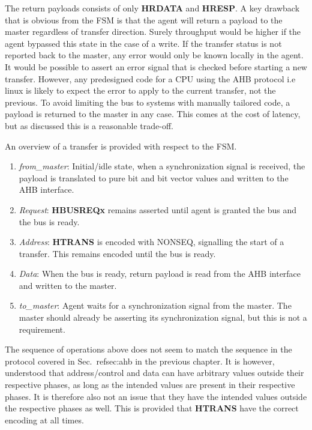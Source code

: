 The return payloads consists of only \textbf{HRDATA} and \textbf{HRESP}. A key drawback that is obvious from the FSM is that the agent will return a payload 
to the master regardless of transfer direction. Surely throughput would be higher if the agent bypassed this state in the case of a write. If the transfer
status is not reported back to the master, any error would only be known locally in the agent. It would be possible to assert an error signal that is checked 
before starting a new transfer. However, any predesigned code for a CPU using the AHB protocol i.e linux is likely to expect the error to apply to the current transfer, not the previous. To avoid limiting the bus to systems with manually tailored code, a payload is returned to the master in any case. This comes
at the cost of latency, but as discussed this is a reasonable trade-off. \par
An overview of a transfer is provided with respect to the FSM.
\begin{enumerate}
 \item \textit{from\_master}: Initial/idle state, when a synchronization signal is received, the payload is translated to pure bit and bit vector values and written to the AHB interface.
 \item \textit{Request}: \textbf{HBUSREQx} remains asserted until agent is granted the bus and the bus is ready.
 \item \textit{Address}: \textbf{HTRANS} is encoded with NONSEQ, signalling the start of a transfer. This remains encoded until the bus is ready.
 \item \textit{Data}: When the bus is ready, return payload is read from the AHB interface and written to the master.
 \item \textit{to\_master}: Agent waits for a synchronization signal from the master. The master should already be asserting its synchronization signal, but this is not a requirement.   
\end{enumerate}

The sequence of operations above does not seem to match the sequence in the protocol covered in Sec.~ref{sec:ahb} in the previous chapter. It is however, 
understood that address/control and data can have arbitrary values outside their respective phases, as long as the intended values are present in their 
respective phases. It is therefore also not an issue that they have the intended values outside the respective phases as well. This is provided that \textbf{HTRANS} have the correct encoding at all times.  
 

